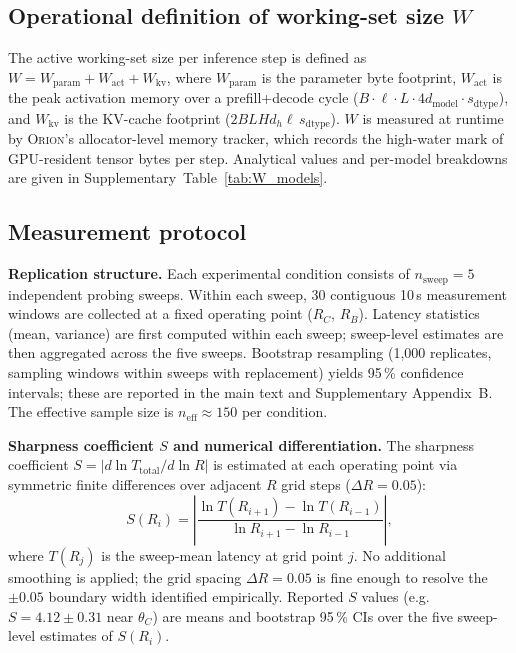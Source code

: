 \subsection*{Operational definition of working-set size $W$}

The active working-set size per inference step is defined as
$W = W_{\mathrm{param}} + W_{\mathrm{act}} + W_{\mathrm{kv}}$,
where $W_{\mathrm{param}}$ is the parameter byte footprint,
$W_{\mathrm{act}}$ is the peak activation memory over a prefill+decode cycle
($B \cdot \ell \cdot L \cdot 4 d_{\mathrm{model}} \cdot s_{\mathrm{dtype}}$),
and $W_{\mathrm{kv}}$ is the KV-cache footprint
($2 B L H d_h \ell \, s_{\mathrm{dtype}}$).
$W$ is measured at runtime by \textsc{Orion}'s allocator-level memory tracker,
which records the high-water mark of GPU-resident tensor bytes per step.
Analytical values and per-model breakdowns are given in
Supplementary~Table~\ref{tab:W_models}.

\subsection*{Measurement protocol}

\textbf{Replication structure.}
Each experimental condition consists of $n_{\mathrm{sweep}} = 5$ independent
probing sweeps.
Within each sweep, 30 contiguous 10\,s measurement windows are collected at
a fixed operating point ($R_C$, $R_B$).
Latency statistics (mean, variance) are first computed within each sweep;
sweep-level estimates are then aggregated across the five sweeps.
Bootstrap resampling (1,000 replicates, sampling windows within sweeps with
replacement) yields 95\,\% confidence intervals; these are reported in the main
text and Supplementary Appendix~B.
The effective sample size is $n_{\mathrm{eff}} \approx 150$ per condition.

\textbf{Sharpness coefficient $S$ and numerical differentiation.}
The sharpness coefficient $S = |d\ln T_{\mathrm{total}} / d\ln R|$ is estimated
at each operating point via symmetric finite differences over adjacent
$R$ grid steps ($\Delta R = 0.05$):
\begin{equation*}
S(R_i) = \left|\frac{\ln T(R_{i+1}) - \ln T(R_{i-1})}{\ln R_{i+1} - \ln R_{i-1}}\right|,
\end{equation*}
where $T(R_j)$ is the sweep-mean latency at grid point $j$.
No additional smoothing is applied; the grid spacing $\Delta R = 0.05$ is fine
enough to resolve the $\pm 0.05$ boundary width identified empirically.
Reported $S$ values (e.g.\ $S = 4.12 \pm 0.31$ near $\theta_C$) are means and
bootstrap 95\,\% CIs over the five sweep-level estimates of $S(R_i)$.


